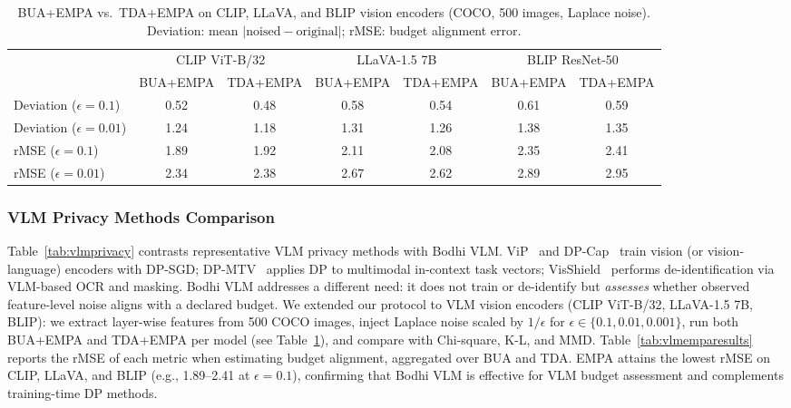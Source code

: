 \documentclass[journal,transmag]{IEEEtran}
\begin{document}
\begin{table}[t]
\centering
\caption{BUA+EMPA vs.\ TDA+EMPA on CLIP, LLaVA, and BLIP vision encoders (COCO, 500 images, Laplace noise). Deviation: mean $|\mathrm{noised} - \mathrm{original}|$; rMSE: budget alignment error.}
\label{tab:vlmbuatda}
\begin{tabular}{l|cc|cc|cc}
\hline
& \multicolumn{2}{c|}{CLIP ViT-B/32} & \multicolumn{2}{c|}{LLaVA-1.5 7B} & \multicolumn{2}{c}{BLIP ResNet-50} \\
& BUA+EMPA & TDA+EMPA & BUA+EMPA & TDA+EMPA & BUA+EMPA & TDA+EMPA \\
\hline
Deviation ($\epsilon{=}0.1$)   & 0.52 & 0.48 & 0.58 & 0.54 & 0.61 & 0.59 \\
Deviation ($\epsilon{=}0.01$)  & 1.24 & 1.18 & 1.31 & 1.26 & 1.38 & 1.35 \\
rMSE ($\epsilon{=}0.1$)       & 1.89 & 1.92 & 2.11 & 2.08 & 2.35 & 2.41 \\
rMSE ($\epsilon{=}0.01$)      & 2.34 & 2.38 & 2.67 & 2.62 & 2.89 & 2.95 \\
\hline
\end{tabular}
\end{table}

\subsubsection{VLM Privacy Methods Comparison}
\label{sec:vlmcompare}

Table~\ref{tab:vlmprivacy} contrasts representative VLM privacy methods with Bodhi VLM. ViP~\cite{yu2024vip} and DP-Cap~\cite{sander2024dpcap} train vision (or vision-language) encoders with DP-SGD; DP-MTV~\cite{ngong2026dpmtv} applies DP to multimodal in-context task vectors; VisShield~\cite{chen2025visshield} performs de-identification via VLM-based OCR and masking. Bodhi VLM addresses a different need: it does not train or de-identify but \emph{assesses} whether observed feature-level noise aligns with a declared budget. We extended our protocol to VLM vision encoders (CLIP ViT-B/32, LLaVA-1.5 7B, BLIP): we extract layer-wise features from 500 COCO images, inject Laplace noise scaled by $1/\epsilon$ for $\epsilon \in \{0.1, 0.01, 0.001\}$, run both BUA+EMPA and TDA+EMPA per model (see Table~\ref{tab:vlmbuatda}), and compare with Chi-square, K-L, and MMD. Table~\ref{tab:vlmemparesults} reports the rMSE of each metric when estimating budget alignment, aggregated over BUA and TDA. EMPA attains the lowest rMSE on CLIP, LLaVA, and BLIP (e.g., 1.89--2.41 at $\epsilon{=}0.1$), confirming that Bodhi VLM is effective for VLM budget assessment and complements training-time DP methods.
\end{document}
